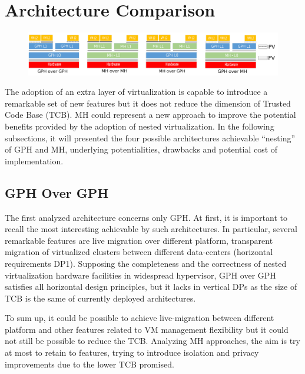 \documentclass{sig-alternate}
\begin{document}
\section{Architecture Comparison}
\label{sec:archcomp}

\begin{figure}
\begin{center}
\includegraphics[width=2\columnwidth]{globalcut.png}
\end{center}
\caption{}
\label{fig:io}
\end{figure}

The adoption of an extra layer of virtualization is capable to introduce a remarkable set of new features but it does not reduce the dimension of Trusted Code Base (TCB).
MH could represent a new approach to improve the potential benefits provided by the adoption of nested virtualization. In the following subsections, it will presented the four possible architectures achievable ``nesting'' of GPH and MH, underlying potentialities, drawbacks and potential cost of implementation.

\subsection{GPH Over GPH}

The first analyzed architecture concerns only GPH. At first, it is important to recall the most interesting achievable by such architectures. In particular, several remarkable features are live migration over different platform, transparent migration of virtualized clusters between different data-centers (horizontal requirements DP1).
Supposing the completeness and the correctness of nested virtualization hardware facilities in widespread hypervisor, GPH over GPH satisfies all horizontal design principles, but it lacks in vertical DPs as the size of TCB is the same of currently deployed architectures.

To sum up, it could be possible to achieve live-migration between different platform and other features related to VM management flexibility but it could not still be possible to reduce the TCB. Analyzing MH approaches, the aim is try at most to retain to features, trying to introduce isolation and privacy improvements due to the lower TCB promised.
\end{document}
